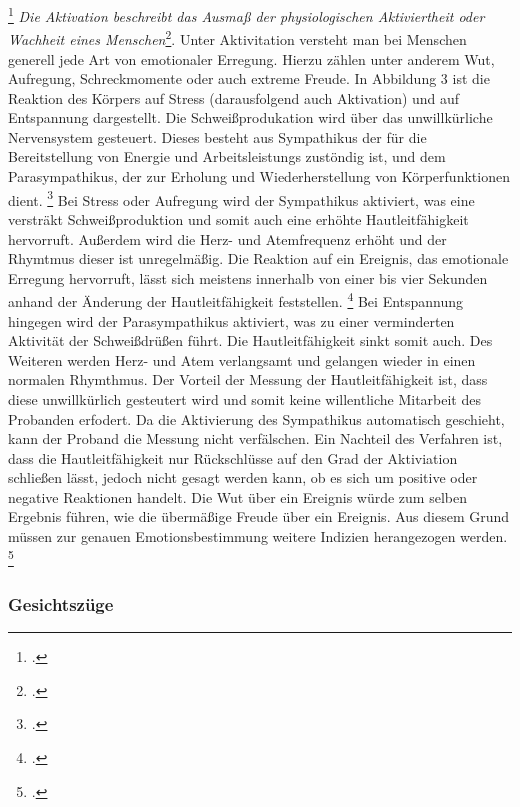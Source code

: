\footcitetext[][S. 200]{Dil13}
\newline
\glqq \textit{Die Aktivation beschreibt das Ausmaß der physiologischen Aktiviertheit oder Wachheit eines Menschen}\grqq{}\footcite[][S. 28]{Die06}. Unter Aktivitation versteht man bei Menschen generell jede Art von emotionaler Erregung. Hierzu zählen unter anderem Wut, Aufregung, Schreckmomente oder auch extreme Freude. In Abbildung 3 ist die Reaktion des Körpers auf Stress (darausfolgend auch Aktivation) und auf Entspannung dargestellt. Die Schweißprodukation wird über das unwillkürliche Nervensystem gesteuert. Dieses besteht aus Sympathikus der für die Bereitstellung von Energie und Arbeitsleistungs zustöndig ist, und dem Parasympathikus, der zur Erholung und Wiederherstellung von Körperfunktionen dient. \footcite[Vgl. ][S. 5]{Lie13} \newline Bei Stress oder Aufregung wird der Sympathikus aktiviert, was eine versträkt Schweißproduktion und somit auch eine erhöhte Hautleitfähigkeit hervorruft. Außerdem wird die Herz- und Atemfrequenz erhöht und der Rhymtmus dieser ist unregelmäßig. Die Reaktion auf ein Ereignis, das emotionale Erregung hervorruft, lässt sich meistens innerhalb von einer bis vier Sekunden anhand der Änderung der Hautleitfähigkeit feststellen. \footcite[Vgl.][S. 130f]{Sch14} \newline 
Bei Entspannung hingegen wird der Parasympathikus aktiviert, was zu einer verminderten Aktivität der Schweißdrüßen führt. Die Hautleitfähigkeit sinkt somit auch. Des Weiteren werden Herz- und Atem verlangsamt und gelangen wieder in einen normalen Rhymthmus. \newline
Der Vorteil der Messung der Hautleitfähigkeit ist, dass diese unwillkürlich gesteutert wird und somit keine willentliche Mitarbeit des Probanden erfodert. Da die Aktivierung des Sympathikus automatisch geschieht, kann der Proband die Messung nicht verfälschen. \newline
Ein Nachteil des Verfahren ist, dass die Hautleitfähigkeit nur Rückschlüsse auf den Grad der Aktiviation schließen lässt, jedoch nicht gesagt werden kann, ob es sich um positive oder negative Reaktionen handelt. Die Wut über ein Ereignis würde zum selben Ergebnis führen, wie die übermäßige Freude über ein Ereignis. Aus diesem Grund müssen zur genauen Emotionsbestimmung weitere Indizien herangezogen werden. \footcite[Vgl. ][S.77]{Moe07}
\subsubsection{Gesichtszüge}
